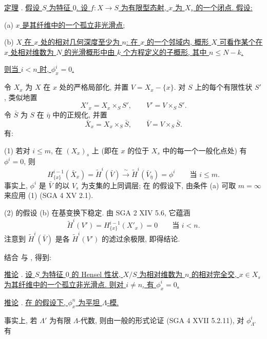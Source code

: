 
\underline{定理} . \underline{假设 $S$ 为特征 $0$. 设 $f:X\longrightarrow S$ 为有限型态射, $x$ 为 $X_s$ 的一个闭点. 假设:}

(a) \underline{$x$ 是其纤维中的一个孤立非光滑点;}

(b) \underline{$X$ 在 $x$ 处的相对几何深度至少为 $n$: 在 $x$ 的一个邻域内, 概形 $X$ 可看作某个在 $x$ 处相对维数为 $N$ 的光滑概形中由 $k$ 个方程定义的子概形, 其中 $n\leqslant N-k$.}

\underline{则当 $i<n$ 时, $\phi^i_x=0$.}

令 $X_x$ 为 $X$ 在 $x$ 处的严格局部化, 并置 $V=X_x-\{x\}$. 对 $S$ 上的每个有限性状 $S'$, 类似地置
\[
X'_x=X_x\times_S S',\qquad V'=V\times_S S'.
\]
令 $\bar S$ 为 $S$ 在 $\bar\eta$ 中的正规化, 并置
\[
\bar X_x=X_x\times_S\bar S,
\qquad \bar V=V\times_S\bar S.
\]
有:

(1) 若对 $i\leqslant m$, 在 $(X_x)_s$ 上 (即在 $x$ 的位于 $X_s$ 中的每一个一般化点处) 有 $\phi^i=0$, 则
\begin{equation*}
H^{i-1}_{\{x\}}(\bar X_x)
=\widetilde H^{i}(\bar V)
\xrightarrow{\ \sim\ }
\widetilde H^{i}(\bar V_{\bar\eta})
=\phi^i
\qquad\text{当 }i\leqslant m.
\end{equation*}
事实上, $\phi^i$ 是 $\bar V$ 的以 $V_s$ 为支集的上同调层; 在  的假设下, 由条件 (a) 可取 $m=\infty$ 来应用 (1) (SGA 4 XV 2.1).

(2)  的假设 (b) 在基变换下稳定. 由 SGA 2 XIV 5.6, 它蕴涵
\begin{equation*}
\widetilde H^{i}(V')
=H^{i-1}_{\{x\}}(X'_x)=0
\qquad\text{当 }i<n.
\end{equation*}
注意到 $\widetilde H^{i}(\bar V)$ 是各 $\widetilde H^{i}(V')$ 的滤过余极限, 即得结论.

结合  与 , 得到:

\underline{推论} . \underline{设 $S$ 为特征 $0$ 的 Hensel 性状, $X/S$ 为相对维数为 $n$ 的相对完全交, $x\in X_s$ 为其纤维中的一个孤立非光滑点. 则对 $i\ne n$, 有 $\phi^i_x=0$.}

\underline{推论} . \underline{在  的假设下, $\phi^n_x$ 为平坦 $\Lambda$-模.}

事实上, 若 $\Lambda'$ 为有限 $\Lambda$-代数, 则由一般的形式论证 (SGA 4 XVII 5.2.11), 对 $\phi^i_{\Lambda'}$ 有

